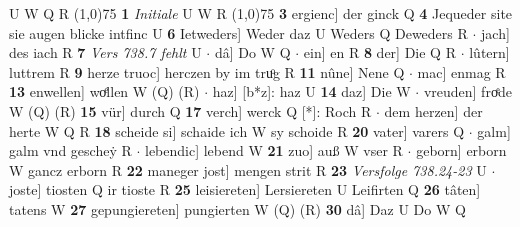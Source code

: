\documentclass[8pt,a4paper,notitlepage]{article}
\begin{document}
\begin{table}[ht]
\begin{minipage}[t]{0.5\linewidth}
U W Q R \newline
\line(1,0){75} \newline
\textbf{1} \textit{Initiale} U W R  \newline
\line(1,0){75} \newline
\textbf{3} ergienc] der ginck Q \textbf{4} Jequeder site sie augen blicke intfinc U \textbf{6} Ietweders] Weder daz U Weders Q Deweders R  $\cdot$ jach] des iach R \textbf{7} \textit{Vers 738.7 fehlt} U   $\cdot$ dâ] Do W Q  $\cdot$ ein] en R \textbf{8} der] Die Q R  $\cdot$ lûtern] luttrem R \textbf{9} herze truoc] herczen by im truͦg R \textbf{11} nûne] Nene Q  $\cdot$ mac] enmag R \textbf{13} enwellen] woͤllen W (Q) (R)  $\cdot$ haz] [b*z]: haz U \textbf{14} daz] Die W  $\cdot$ vreuden] froͤde W (Q) (R) \textbf{15} vür] durch Q \textbf{17} verch] werck Q [*]: Roch R  $\cdot$ dem herzen] der herte W Q R \textbf{18} scheide si] schaide ich W sy schoide R \textbf{20} vater] varers Q  $\cdot$ galm] galm vnd gescheẏ R  $\cdot$ lebendic] lebend W \textbf{21} zuo] auß W vser R  $\cdot$ geborn] erborn W gancz erborn R \textbf{22} maneger jost] mengen strit R \textbf{23} \textit{Versfolge 738.24-23} U   $\cdot$ joste] tiosten Q ir tioste R \textbf{25} leisiereten] Lersiereten U Leifirten Q \textbf{26} tâten] tatens W \textbf{27} gepungiereten] pungierten W (Q) (R) \textbf{30} dâ] Daz U Do W Q \newline
\end{minipage}
\end{table}
\end{document}
